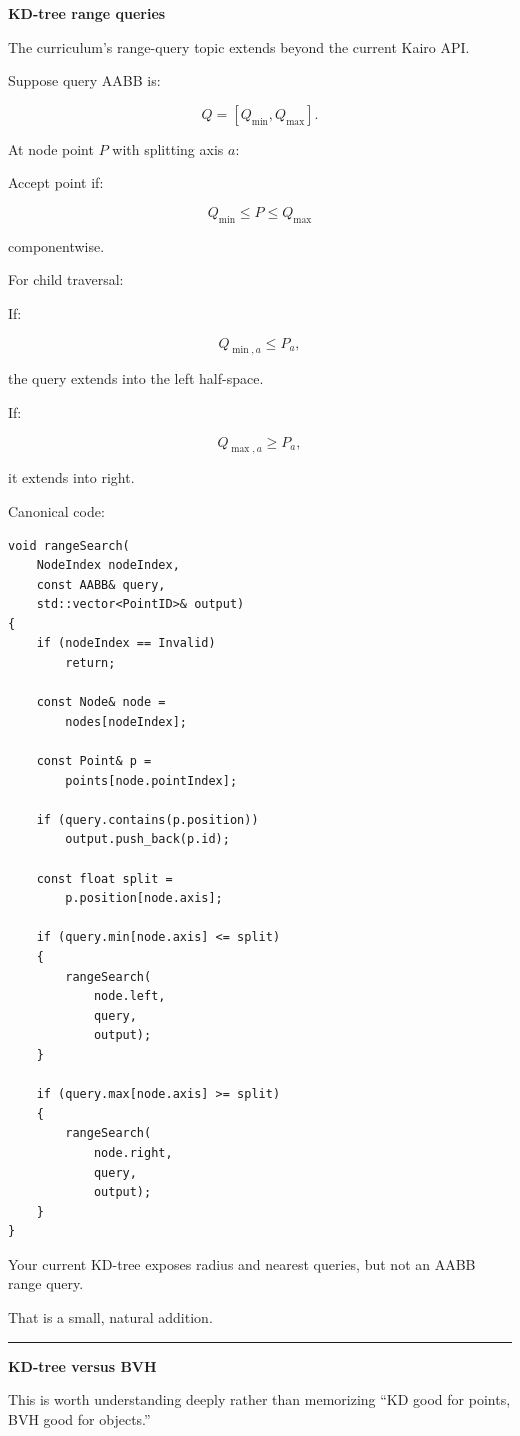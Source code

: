 \textbf{KD-tree range queries}

The curriculum's range-query topic extends beyond the current Kairo API.

Suppose query AABB is:

\[
Q=[Q_{\min},Q_{\max}].
\]

At node point \(P\) with splitting axis \(a\):

Accept point if:

\[
Q_{\min}\le P\le Q_{\max}
\]

componentwise.

For child traversal:

If:

\[
Q_{\min,a}\le P_a,
\]

the query extends into the left half-space.

If:

\[
Q_{\max,a}\ge P_a,
\]

it extends into right.

Canonical code:

\begin{verbatim}
void rangeSearch(
    NodeIndex nodeIndex,
    const AABB& query,
    std::vector<PointID>& output)
{
    if (nodeIndex == Invalid)
        return;

    const Node& node =
        nodes[nodeIndex];

    const Point& p =
        points[node.pointIndex];

    if (query.contains(p.position))
        output.push_back(p.id);

    const float split =
        p.position[node.axis];

    if (query.min[node.axis] <= split)
    {
        rangeSearch(
            node.left,
            query,
            output);
    }

    if (query.max[node.axis] >= split)
    {
        rangeSearch(
            node.right,
            query,
            output);
    }
}
\end{verbatim}

Your current KD-tree exposes radius and nearest queries, but not an AABB range query.

That is a small, natural addition.

\begin{center}\rule{0.5\linewidth}{0.5pt}\end{center}

\textbf{KD-tree versus BVH}

This is worth understanding deeply rather than memorizing ``KD good for points, BVH good for objects.''

